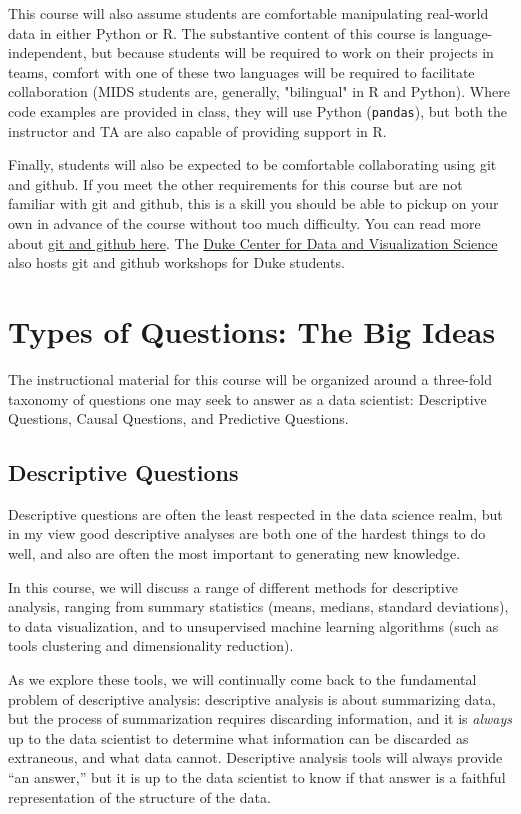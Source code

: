 \documentclass[12pt]{article}
\begin{document}
This course will also assume students are comfortable manipulating real-world data in either Python or R. The substantive content of this course is language-independent, but because students will be required to work on their projects in teams, comfort with one of these two languages will be required to facilitate collaboration (MIDS students are, generally, "bilingual" in R and Python). Where code examples are provided in class, they will use Python (\texttt{pandas}), but both the instructor and TA are also capable of providing support in R.

Finally, students will also be expected to be comfortable collaborating using git and github. If you meet the other requirements for this course but are not familiar with git and github, this is a skill you should be able to pickup on your own in advance of the course without too much difficulty. You can read more about \href{https://www.practicaldatascience.org/html/git_and_github.html}{git and github here}. The \href{https://library.duke.edu/data/}{Duke Center for Data and Visualization Science} also hosts git and github workshops for Duke students.


\section{Types of Questions: The Big Ideas}

The instructional material for this course will be organized around a three-fold taxonomy of questions one may seek to answer as a data scientist: Descriptive Questions, Causal Questions, and Predictive Questions.

\subsection{Descriptive Questions}

Descriptive questions are often the least respected in the data science realm, but in my view good descriptive analyses are both one of the hardest things to do well, and also are often the most important to generating new knowledge.

In this course, we will discuss a range of different methods for descriptive analysis, ranging from summary statistics (means, medians, standard deviations), to data visualization, and to unsupervised machine learning algorithms (such as tools clustering and dimensionality reduction).

As we explore these tools, we will continually come back to the fundamental problem of descriptive analysis: descriptive analysis is about summarizing data, but the process of summarization requires discarding information, and it is \emph{always} up to the data scientist to determine what information can be discarded as extraneous, and what data cannot. Descriptive analysis tools will always provide ``an answer,'' but it is up to the data scientist to know if that answer is a faithful representation of the structure of the data.
\end{document}
